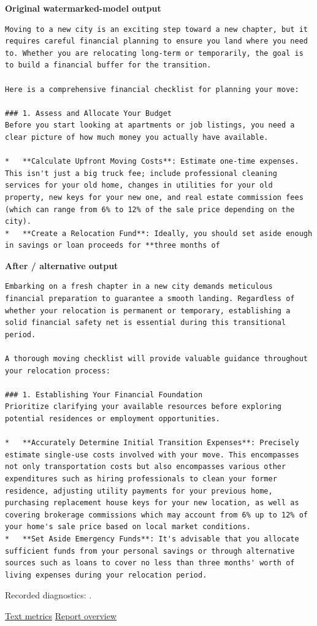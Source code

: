 \textbf{Original watermarked-model output}

\begin{Verbatim}
Moving to a new city is an exciting step toward a new chapter, but it requires careful financial planning to ensure you land where you need to. Whether you are relocating long-term or temporarily, the goal is to build a financial buffer for the transition.

Here is a comprehensive financial checklist for planning your move:

### 1. Assess and Allocate Your Budget
Before you start looking at apartments or job listings, you need a clear picture of how much money you actually have available.

*   **Calculate Upfront Moving Costs**: Estimate one-time expenses. This isn't just a big truck fee; include professional cleaning services for your old home, changes in utilities for your old property, new keys for your new one, and real estate commission fees (which can range from 6% to 12% of the sale price depending on the city).
*   **Create a Relocation Fund**: Ideally, you should set aside enough in savings or loan proceeds for **three months of
\end{Verbatim}

\textbf{After / alternative output}

\begin{Verbatim}
Embarking on a fresh chapter in a new city demands meticulous financial preparation to guarantee a smooth landing. Regardless of whether your relocation is permanent or temporary, establishing a solid financial safety net is essential during this transitional period.

A thorough moving checklist will provide valuable guidance throughout your relocation process:

### 1. Establishing Your Financial Foundation
Prioritize clarifying your available resources before exploring potential residences or employment opportunities.

*   **Accurately Determine Initial Transition Expenses**: Precisely estimate single-use costs involved with your move. This encompasses not only transportation costs but also encompasses various other expenditures such as hiring professionals to clean your former residence, adjusting utility payments for your previous home, purchasing replacement house keys for your new location, as well as covering brokerage commissions which may account from 6% up to 12% of your home's sale price based on local market conditions.
*   **Set Aside Emergency Funds**: It's advisable that you allocate sufficient funds from your personal savings or through alternative sources such as loans to cover no less than three months' worth of living expenses during your relocation period.
\end{Verbatim}

Recorded diagnostics:
\texttt{}.

\href{records/docs/watermarking/text.tex}{Text metrics} \textbar{}
\href{../docs/watermarking/README.md}{Report overview}
